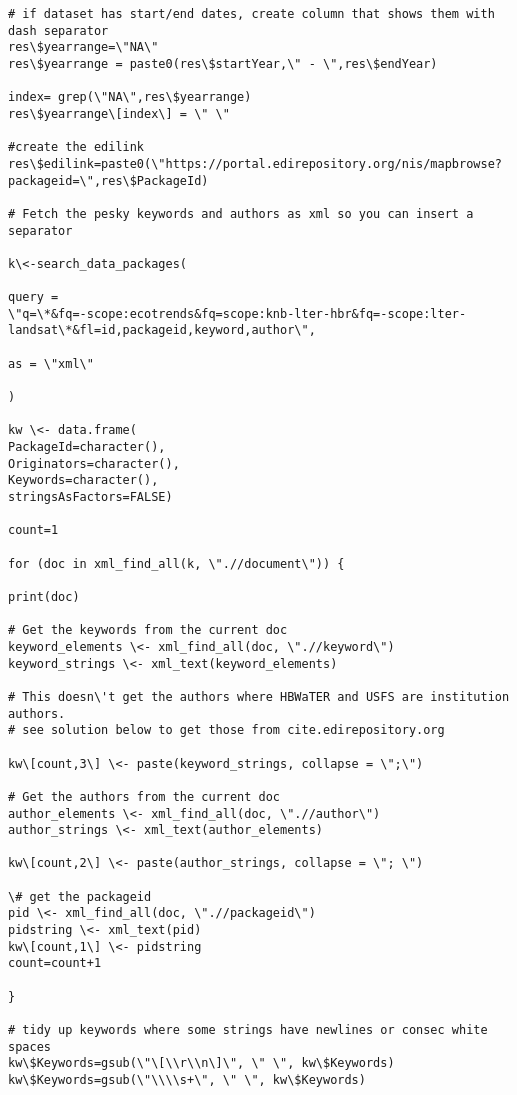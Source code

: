 \documentclass[
  letterpaper,
  DIV=11,
  numbers=noendperiod]{scrreprt}
\begin{document}
\begin{verbatim}
# if dataset has start/end dates, create column that shows them with
dash separator
res\$yearrange=\"NA\"
res\$yearrange = paste0(res\$startYear,\" - \",res\$endYear)

index= grep(\"NA\",res\$yearrange)
res\$yearrange\[index\] = \" \"

#create the edilink
res\$edilink=paste0(\"https://portal.edirepository.org/nis/mapbrowse?packageid=\",res\$PackageId)

# Fetch the pesky keywords and authors as xml so you can insert a
separator

k\<-search_data_packages(

query =
\"q=\*&fq=-scope:ecotrends&fq=scope:knb-lter-hbr&fq=-scope:lter-landsat\*&fl=id,packageid,keyword,author\",

as = \"xml\"

)

kw \<- data.frame(
PackageId=character(),
Originators=character(),
Keywords=character(),
stringsAsFactors=FALSE)

count=1

for (doc in xml_find_all(k, \".//document\")) {

print(doc)

# Get the keywords from the current doc
keyword_elements \<- xml_find_all(doc, \".//keyword\")
keyword_strings \<- xml_text(keyword_elements)

# This doesn\'t get the authors where HBWaTER and USFS are institution
authors.
# see solution below to get those from cite.edirepository.org

kw\[count,3\] \<- paste(keyword_strings, collapse = \";\")

# Get the authors from the current doc
author_elements \<- xml_find_all(doc, \".//author\")
author_strings \<- xml_text(author_elements)

kw\[count,2\] \<- paste(author_strings, collapse = \"; \")

\# get the packageid
pid \<- xml_find_all(doc, \".//packageid\")
pidstring \<- xml_text(pid)
kw\[count,1\] \<- pidstring
count=count+1

}

# tidy up keywords where some strings have newlines or consec white
spaces
kw\$Keywords=gsub(\"\[\\r\\n\]\", \" \", kw\$Keywords)
kw\$Keywords=gsub(\"\\\\s+\", \" \", kw\$Keywords)


\end{verbatim}
\end{document}
